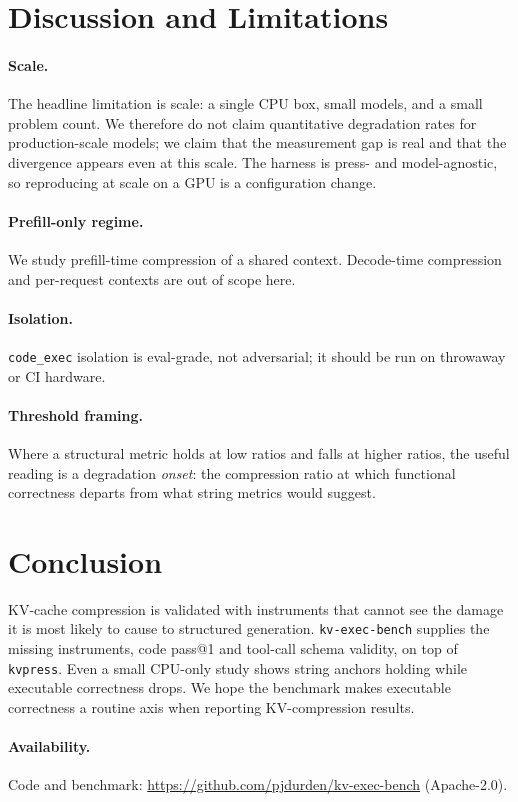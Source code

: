 \documentclass[11pt]{article}
\begin{document}
\section{Discussion and Limitations}
\label{sec:discussion}

\paragraph{Scale.} The headline limitation is scale: a single CPU box, small models, and a small
problem count. We therefore do not claim quantitative degradation rates for production-scale models;
we claim that the measurement gap is real and that the divergence appears even at this scale. The
harness is press- and model-agnostic, so reproducing at scale on a GPU is a configuration change.

\paragraph{Prefill-only regime.} We study prefill-time compression of a shared context. Decode-time
compression and per-request contexts are out of scope here.

\paragraph{Isolation.} \texttt{code\_exec} isolation is eval-grade, not adversarial; it should be run
on throwaway or CI hardware.

\paragraph{Threshold framing.} Where a structural metric holds at low ratios and falls at higher
ratios, the useful reading is a degradation \emph{onset}: the compression ratio at which functional
correctness departs from what string metrics would suggest.

\section{Conclusion}
\label{sec:conclusion}

KV-cache compression is validated with instruments that cannot see the damage it is most likely to
cause to structured generation. \texttt{kv-exec-bench} supplies the missing instruments, code pass@1
and tool-call schema validity, on top of \texttt{kvpress}. Even a small CPU-only study shows string
anchors holding while executable correctness drops. We hope the benchmark makes executable
correctness a routine axis when reporting KV-compression results.

\paragraph{Availability.} Code and benchmark: \url{https://github.com/pjdurden/kv-exec-bench} (Apache-2.0).



\end{document}
